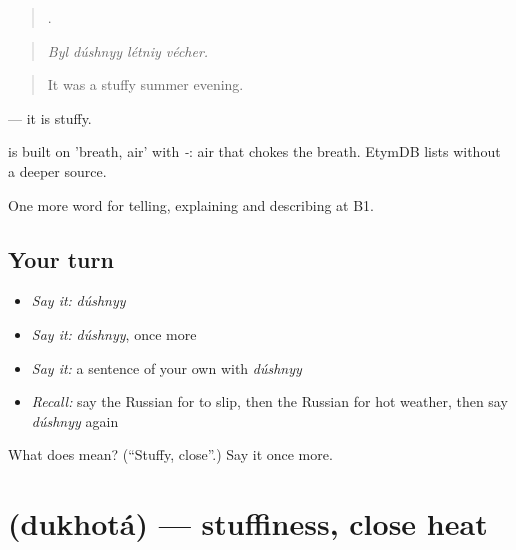 \begin{quote}
   .
\end{quote}

\begin{quote}
\emph{Byl dúshnyy létniy vécher.}
\end{quote}

\begin{quote}
It was a stuffy summer evening.
\end{quote}

\emph{} — it is stuffy.

\begin{cousinweb}
\emph{} is built on \emph{} 'breath, air' with \emph{-}: air that chokes the breath. EtymDB lists \emph{} without a deeper source.
\end{cousinweb}

\begin{grammarlens}[title={What you've built}]
One more word for telling, explaining and describing at B1.
\end{grammarlens}

\subsection*{Your turn}
\begin{itemize}
\raggedright
  \item \emph{Say it:} \emph{dúshnyy}
  \item \emph{Say it:} \emph{dúshnyy}, once more
  \item \emph{Say it:} a sentence of your own with \emph{dúshnyy}
  \item \emph{Recall:} say the Russian for to slip, then the Russian for hot weather, then say \emph{dúshnyy} again
\end{itemize}

\begin{tcolorbox}[breakable,colback=teal!4,colframe=teal!35!black,title={Before you move on}]
What does  mean? (\textquotedblleft{}Stuffy, close\textquotedblright{}.) Say it once more.
\end{tcolorbox}
\section[\texorpdfstring{\ru{духота} (dukhotá)}{духота (dukhotá)}]{ (dukhotá) — stuffiness, close heat}

\label{lesson:RU-C468-dukhota}




